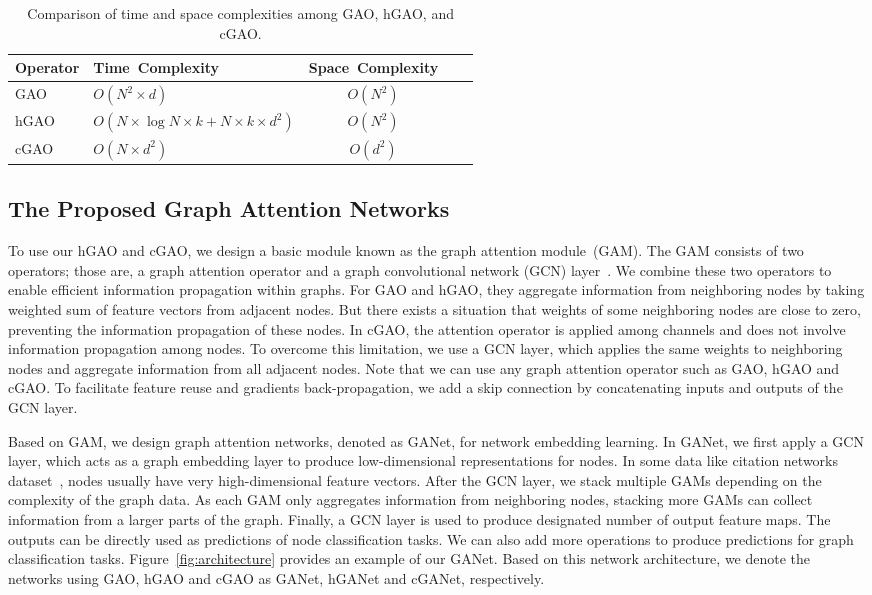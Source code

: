 \documentclass[sigconf]{acmart}
\begin{document}
\begin{table}[t]
\caption{Comparison of time and space complexities among GAO, hGAO,
and cGAO.} \label{table:gaos}
\begin{tabularx}{\columnwidth}{  lx{3.5cm} cx{4cm} Y }
    \hline
    \textbf{Operator} & \textbf{Time~Complexity} & \textbf{Space~Complexity} \\ \hline\hline
    GAO    & $O(N^2\times d)$ & $O(N^2)$   \\ \hline
    hGAO   & $O(N \times \log N \times k + N \times k \times d^2)$  & $O(N^2)$    \\ \hline
    cGAO   & $O(N \times d^2)$  & $O(d^2)$    \\ \hline
    \hline
\end{tabularx}
\end{table}


\subsection{The Proposed Graph Attention Networks}\label{sec:GHAN}

To use our hGAO and cGAO, we design a basic module known as the
graph attention module~(GAM). The GAM consists of two operators;
those are, a graph attention operator and a graph convolutional
network (GCN) layer~\cite{kipf2016semi}. We combine these two
operators to enable efficient information propagation within graphs.
For GAO and hGAO, they aggregate information from neighboring nodes
by taking weighted sum of feature vectors from adjacent nodes. But
there exists a situation that weights of some neighboring nodes are
close to zero, preventing the information propagation of these
nodes. In cGAO, the attention operator is applied among channels and
does not involve information propagation among nodes. To overcome
this limitation, we use a GCN layer, which applies the same weights
to neighboring nodes and aggregate information from all adjacent
nodes. Note that we can use any graph attention operator such as
GAO, hGAO and cGAO. To facilitate feature reuse and gradients
back-propagation, we add a skip connection by concatenating inputs
and outputs of the GCN layer.

Based on GAM, we design graph attention networks, denoted as GANet,
for network embedding learning. In GANet, we first apply a GCN
layer, which acts as a graph embedding layer to produce
low-dimensional representations for nodes. In some data like
citation networks dataset~\cite{kipf2016semi}, nodes usually have
very high-dimensional feature vectors. After the GCN layer, we stack
multiple GAMs depending on the complexity of the graph data. As each
GAM only aggregates information from neighboring nodes, stacking
more GAMs can collect information from a larger parts of the graph.
Finally, a GCN layer is used to produce designated number of output
feature maps. The outputs can be directly used as predictions of
node classification tasks. We can also add more operations to
produce predictions for graph classification tasks.
Figure~\ref{fig:architecture} provides an example of our GANet.
Based on this network architecture, we denote the networks using
GAO, hGAO and cGAO as GANet, hGANet and cGANet, respectively.
\end{document}
